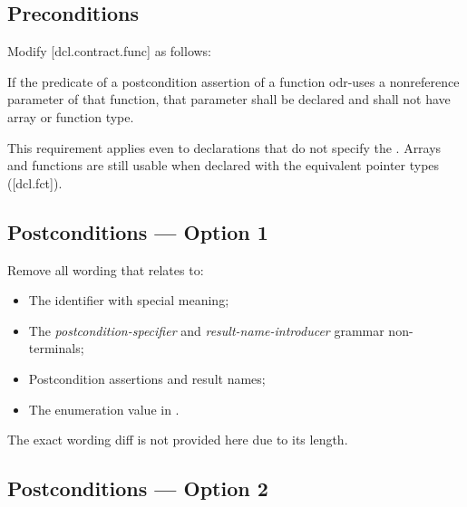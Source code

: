 \subsection*{Preconditions}

Modify [dcl.contract.func] as follows:

\begin{adjustwidth}{0.5cm}{0.5cm}
 If the predicate of a postcondition assertion of a function odr-uses a non\-reference parameter of that function, that parameter shall be declared  and shall not have array or function type. 
\begin{note}
This requirement applies even to declarations
that do not specify the . Arrays and functions are still usable when declared with the equivalent pointer types ([dcl.fct]).
\end{note}
\begin{example}
\tcode{[...]}
\end{example}
\end{adjustwidth}

\subsection*{Postconditions --- Option 1}

Remove all wording that relates to:
\begin{itemize}
\item The  identifier with special meaning;
\item The \emph{postcondition-specifier} and \emph{result-name-introducer} grammar non-terminals;
\item Postcondition assertions and result names;
\item The  enumeration value in .
\end{itemize}
The exact wording diff is not provided here due to its length.

\subsection*{Postconditions --- Option 2}

